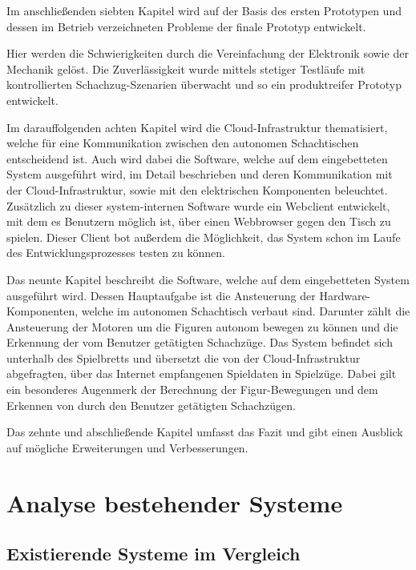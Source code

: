 Im anschließenden siebten Kapitel wird auf der Basis des ersten
Prototypen und dessen im Betrieb verzeichneten Probleme der finale
Prototyp entwickelt.

Hier werden die Schwierigkeiten durch die Vereinfachung der Elektronik
sowie der Mechanik gelöst. Die Zuverlässigkeit wurde mittels stetiger
Testläufe mit kontrollierten Schachzug-Szenarien überwacht und so ein
produktreifer Prototyp entwickelt.

Im darauffolgenden achten Kapitel wird die Cloud-Infrastruktur
thematisiert, welche für eine Kommunikation zwischen den autonomen
Schachtischen entscheidend ist. Auch wird dabei die Software, welche auf
dem eingebetteten System ausgeführt wird, im Detail beschrieben und
deren Kommunikation mit der Cloud-Infrastruktur, sowie mit den
elektrischen Komponenten beleuchtet. Zusätzlich zu dieser
system-internen Software wurde ein Webclient entwickelt, mit dem es
Benutzern möglich ist, über einen Webbrowser gegen den Tisch zu spielen.
Dieser Client bot außerdem die Möglichkeit, das System schon im Laufe
des Entwicklungsprozesses testen zu können.

Das neunte Kapitel beschreibt die Software, welche auf dem eingebetteten
System ausgeführt wird. Dessen Hauptaufgabe ist die Ansteuerung der
Hardware-Komponenten, welche im autonomen Schachtisch verbaut sind.
Darunter zählt die Ansteuerung der Motoren um die Figuren autonom
bewegen zu können und die Erkennung der vom Benutzer getätigten
Schachzüge. Das System befindet sich unterhalb des Spielbretts und
übersetzt die von der Cloud-Infrastruktur abgefragten, über das Internet
empfangenen Spieldaten in Spielzüge. Dabei gilt ein besonderes Augenmerk
der Berechnung der Figur-Bewegungen und dem Erkennen von durch den
Benutzer getätigten Schachzügen.

Das zehnte und abschließende Kapitel umfasst das Fazit und gibt einen
Ausblick auf mögliche Erweiterungen und Verbesserungen.

\hypertarget{analyse-bestehender-systeme}{%
\chapter{Analyse bestehender
Systeme}\label{analyse-bestehender-systeme}}

\hypertarget{existierende-systeme-im-vergleich}{%
\section{Existierende Systeme im
Vergleich}\label{existierende-systeme-im-vergleich}}

